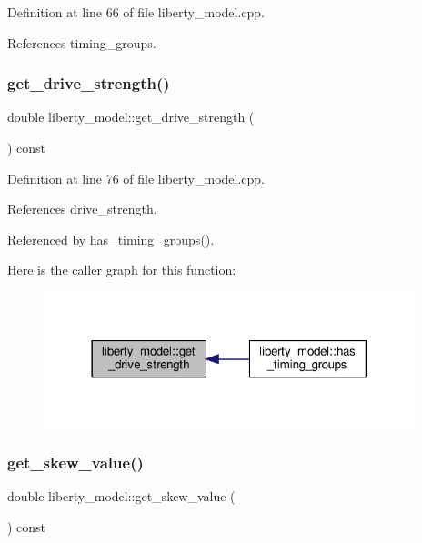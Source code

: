 Definition at line 66 of file liberty\+\_\+model.\+cpp.



References timing\+\_\+groups.

\mbox{\label{classliberty__model_afb9af1e67d10795cb89550a5e4ed68fb}} 
\subsubsection{\texorpdfstring{get\+\_\+drive\+\_\+strength()}{get\_drive\_strength()}}
{\footnotesize\ttfamily double liberty\+\_\+model\+::get\+\_\+drive\+\_\+strength (\begin{DoxyParamCaption}{ }\end{DoxyParamCaption}) const}



Definition at line 76 of file liberty\+\_\+model.\+cpp.



References drive\+\_\+strength.



Referenced by has\+\_\+timing\+\_\+groups().

Here is the caller graph for this function\+:
\nopagebreak
\begin{figure}[H]
\begin{center}
\leavevmode
\includegraphics[width=306pt]{d0/dae/classliberty__model_afb9af1e67d10795cb89550a5e4ed68fb_icgraph}
\end{center}
\end{figure}
\mbox{\label{classliberty__model_a359f25f0b8be48227ebbd87f4727f1a2}} 
\subsubsection{\texorpdfstring{get\+\_\+skew\+\_\+value()}{get\_skew\_value()}}
{\footnotesize\ttfamily double liberty\+\_\+model\+::get\+\_\+skew\+\_\+value (\begin{DoxyParamCaption}{ }\end{DoxyParamCaption}) const}



